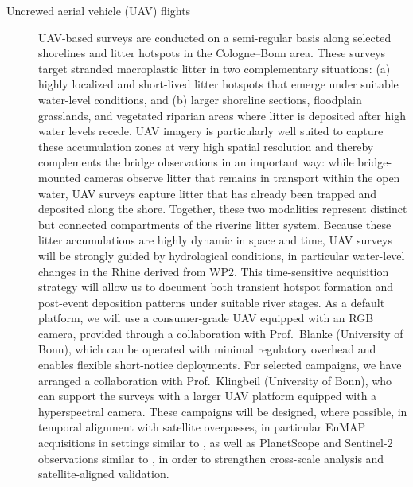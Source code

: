 \documentclass{scrartcl}
\begin{document}
\begin{description}
    \item[Uncrewed aerial vehicle (UAV) flights] UAV-based surveys are conducted on a semi-regular basis along selected shorelines and litter hotspots in the Cologne--Bonn area. These surveys target stranded macroplastic litter in two complementary situations: (a) highly localized and short-lived litter hotspots that emerge under suitable water-level conditions, and (b) larger shoreline sections, floodplain grasslands, and vegetated riparian areas where litter is deposited after high water levels recede. UAV imagery is particularly well suited to capture these accumulation zones at very high spatial resolution and thereby complements the bridge observations in an important way: while bridge-mounted cameras observe litter that remains in transport within the open water, UAV surveys capture litter that has already been trapped and deposited along the shore. Together, these two modalities represent distinct but connected compartments of the riverine litter system. Because these litter accumulations are highly dynamic in space and time, UAV surveys will be strongly guided by hydrological conditions, in particular water-level changes in the Rhine derived from WP2. This time-sensitive acquisition strategy will allow us to document both transient hotspot formation and post-event deposition patterns under suitable river stages. As a default platform, we will use a consumer-grade UAV equipped with an RGB camera, provided through a collaboration with Prof.\ Blanke (University of Bonn), which can be operated with minimal regulatory overhead and enables flexible short-notice deployments. For selected campaigns, we have arranged a collaboration with Prof.\ Klingbeil (University of Bonn), who can support the surveys with a larger UAV platform equipped with a hyperspectral camera. These campaigns will be designed, where possible, in temporal alignment with satellite overpasses, in particular EnMAP acquisitions in settings similar to \citep{maathuis5779542exploring}, as well as PlanetScope and Sentinel-2 observations similar to \cite{perez2025scalable}, in order to strengthen cross-scale analysis and satellite-aligned validation. 
    

\end{description}
\end{document}

